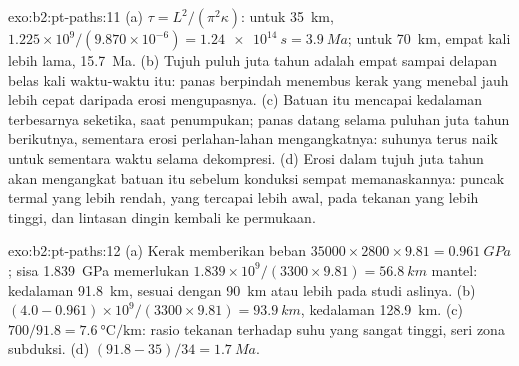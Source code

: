 \begin{solution}{exo:b2:pt-paths:11}
(a) $\tau = L^2/(\pi^2\kappa)$: untuk \qty{35}{km}, $1.225\times10^9/(9.870\times10^{-6}) =
\qty{1.24e14}{s} = \qty{3.9}{Ma}$; untuk \qty{70}{km}, empat kali lebih lama,
\qty{15.7}{Ma}. (b) Tujuh puluh juta tahun adalah empat sampai delapan belas kali waktu-waktu itu: panas
berpindah menembus kerak yang menebal jauh lebih cepat daripada erosi mengupasnya. (c) Batuan itu
mencapai kedalaman terbesarnya seketika, saat penumpukan; panas datang selama puluhan juta tahun
berikutnya, sementara erosi perlahan-lahan mengangkatnya: suhunya terus
naik untuk sementara waktu selama dekompresi. (d) Erosi dalam tujuh juta tahun akan
mengangkat batuan itu sebelum konduksi sempat memanaskannya: puncak termal yang lebih rendah, yang tercapai
lebih awal, pada tekanan yang lebih tinggi, dan lintasan dingin kembali ke permukaan.
\end{solution}

\begin{solution}{exo:b2:pt-paths:12}
(a) Kerak memberikan beban $35000\times2800\times9.81 = \qty{0.961}{GPa}$; sisa
\qty{1.839}{GPa} memerlukan $1.839\times10^9/(3300\times9.81) = \qty{56.8}{km}$ mantel: kedalaman
\qty{91.8}{km}, sesuai dengan \qty{90}{km} atau lebih pada studi aslinya. (b) $(4.0 -
0.961)\times10^9/(3300\times9.81) = \qty{93.9}{km}$, kedalaman \qty{128.9}{km}.
(c) $700/91.8 = \qty{7.6}{\celsius\per\km}$: rasio tekanan terhadap suhu yang sangat tinggi,
seri zona subduksi. (d) $(91.8 - 35)/34 = \qty{1.7}{Ma}$.
\end{solution}

